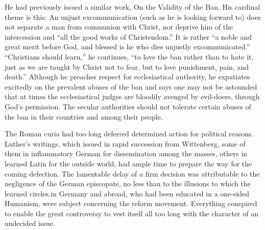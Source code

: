 He had previously issued a similar
work, On the Validity of the Ban. His cardinal theme is this: An
unjust excommunication (such as he is looking forward to) does not
separate a man from communion with Christ, nor deprive him of
the intercession and “all the good works of Christendom.” It is rather
“a noble and great merit before God, and blessed is he who dies unjustly
excommunicated.” “Christians should learn,” he continues,
“to love the ban rather than to hate it, just as we are taught by
Christ not to fear, but to love punishment, pain, and death.” Although
he preaches respect for ecclesiastical authority, he expatiates
excitedly on the prevalent abuses of the ban and says one may not
be astounded that at times the ecclesiastical judges are bloodily
avenged by evil-doers, through God’s permission. The secular authorities
should not tolerate certain abuses of the ban in their countries
and among their people.

The Roman curia had too long deferred determined action for
political reasons. Luther’s writings, which issued in rapid succession
from Wittenberg, some of them in inflammatory German for dissemination
among the masses, others in learned Latin for the outside
world, had ample time to prepare the way for the coming defection.
The lamentable delay of a firm decision was attributable to the negligence
of the German episcopate, no less than to the illusions to which
the learned circles.in Germany and abroad, who had been educated in
a one-sided Humanism, were subject concerning the reform movement.
Everything conspired to enable the great controversy to vest
itself all too long with the character of an undecided issue.
